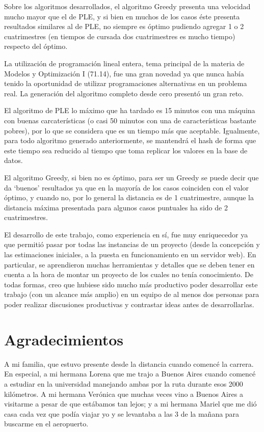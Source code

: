 \documentclass[a4paper]{article}
\begin{document}
Sobre los algoritmos desarrollados, el algoritmo Greedy presenta una velocidad mucho mayor que el de PLE, y si bien en muchos de los casos éste presenta resultados similares al de PLE, no siempre es óptimo pudiendo agregar 1 o 2 cuatrimestres (en tiempos de cursada dos cuatrimestres es mucho tiempo) respecto del óptimo.

La utilización de programación lineal entera, tema principal de la materia de Modelos y Optimización I (71.14), fue una gran novedad ya que nunca había tenido la oportunidad de utilizar programaciones alternativas en un problema real. La generación del algoritmo completo desde cero presentó un gran reto.

El algoritmo de PLE lo máximo que ha tardado es 15 minutos con una máquina con buenas carcaterísticas (o casi 50 minutos con una de características bastante pobres), por lo que se considera que es un tiempo más que aceptable. Igualmente, para todo algoritmo generado anteriormente, se mantendrá el hash de forma que este tiempo sea reducido al tiempo que toma replicar los valores en la base de datos.

El algoritmo Greedy, si bien no es óptimo, para ser un Greedy se puede decir que da `buenos' resultados ya que en la mayoría de los casos coinciden con el valor óptimo, y cuando no, por lo general la distancia es de 1 cuatrimestre, aunque la distancia máxima presentada para algunos casos puntuales ha sido de 2 cuatrimestres.\newline

El desarrollo de este trabajo, como experiencia en sí, fue muy enriquecedor ya que permitió pasar por todas las instancias de un proyecto (desde la concepción y las estimaciones iniciales, a la puesta en funcionamiento en un servidor web). En particular, se aprendieron muchas herramientas y detalles que se deben tener en cuenta a la hora de montar un proyecto de los cuales no tenía conocimiento. De todas formas, creo que hubiese sido mucho más productivo poder desarrollar este trabajo (con un alcance más amplio) en un equipo de al menos dos personas para poder realizar discusiones productivas y contrastar ideas antes de desarrollarlas.

\newpage
\section{Agradecimientos}

A mi familia, que estuvo presente desde la distancia cuando comencé la carrera. En especial, a mi hermana Lorena que me trajo a Buenos Aires cuando comencé a estudiar en la universidad manejando ambas por la ruta durante esos 2000 kilómetros. A mi hermana Verónica que muchas veces vino a Buenos Aires a visitarme a pesar de que estábamos tan lejos; y a mi hermana Mariel que me dió casa cada vez que podía viajar yo y se levantaba a las 3 de la mañana para buscarme en el aeropuerto.
\end{document}
